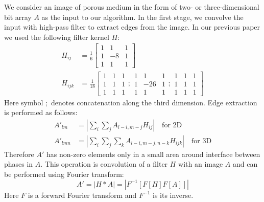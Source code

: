 \documentclass[reprint,amsmath,amssymb,aps,pre,showkeys,showpacs]{revtex4-1}
\begin{document}
We consider an image of porous medium in the form of two- or three-dimensional bit
array $A$ as the input to our algorithm. In the first stage, we convolve the
input with high-pass filter to extract edges from the image. In our previous paper \cite{Samarin} we used the
following filter kernel $H$:
\begin{equation}
  \begin{aligned}
    H_{ij} &= \frac{1}{6} \left[
      \begin{array}{ccc}
        1 & 1 & 1 \\
        1 & -8 & 1 \\
        1 & 1 & 1
      \end{array}
      \right] \\
    H_{ijk} &= \frac{1}{18} \left[
      \begin{array}{ccc}
        1 & 1 & 1 \\
        1 & 1 & 1 \\
        1 & 1 & 1
      \end{array} ;
      \begin{array}{ccc}
        1 & 1 & 1 \\
        1 & -26 & 1 \\
        1 & 1 & 1
      \end{array} ;
      \begin{array}{ccc}
        1 & 1 & 1 \\
        1 & 1 & 1 \\
        1 & 1 & 1
      \end{array}
      \right]
  \end{aligned}
  \label{eq:filter-3x3}
\end{equation}
Here symbol $;$ denotes concatenation along the third dimension. Edge extraction
is performed as follows:
\begin{align*}
  A'_{lm}  &= \left| \sum_i\sum_j A_{l-i, m-j}H_{ij} \right| \quad \text{for 2D} \\
  A'_{lmn} &= \left| \sum_i\sum_j\sum_k A_{l-i, m-j, n-k}H_{ijk} \right| \quad
  \text{for 3D}
\end{align*}
Therefore $A'$ has non-zero elements only in a small area around interface
between phases in $A$. This operation is convolution of a filter $H$ with an
image $A$ and can be performed using Fourier transform:
\begin{equation*}
  A' = |H*A| = |F^{-1}[F[H] F[A]]|
\end{equation*}
Here $F$ is a forward Fourier transform and $F^{-1}$ is its inverse.
\end{document}

